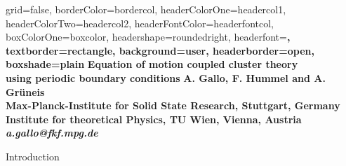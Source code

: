 \documentclass[a0paper,portrait]{baposter}
\begin{document}
\begin{poster}{
grid=false,
borderColor=bordercol, %
headerColorOne=headercol1, %
headerColorTwo=headercol2, %
headerFontColor=headerfontcol, %
boxColorOne=boxcolor, %
headershape=roundedright, %
headerfont=\Large\sf\bf, %
textborder=rectangle,
background=user,
headerborder=open, %
boxshade=plain
}
{}
{\sf\bf
  \hspace*{-1em}
  Equation of motion coupled cluster theory \\
  using periodic boundary conditions
} %
{\vspace{.2em}\bf A. Gallo, F. Hummel and A. Gr\"uneis\\ %
{\smaller\bf Max-Planck-Institute for Solid State Research, Stuttgart, Germany}\\  %
\vspace{-0.2em}
{\smaller\bf Institute for theoretical Physics, TU Wien, Vienna, Austria}\\  %
{\smaller\it a.gallo@fkf.mpg.de}  %
\vspace{-1cm}
}



\begin{posterbox}[ name=introduction,column=0,span=3,row=0.03 ]{Introduction}

  

\end{posterbox}


\def\posterImageSize{0.95}

\end{poster}
\end{document}

